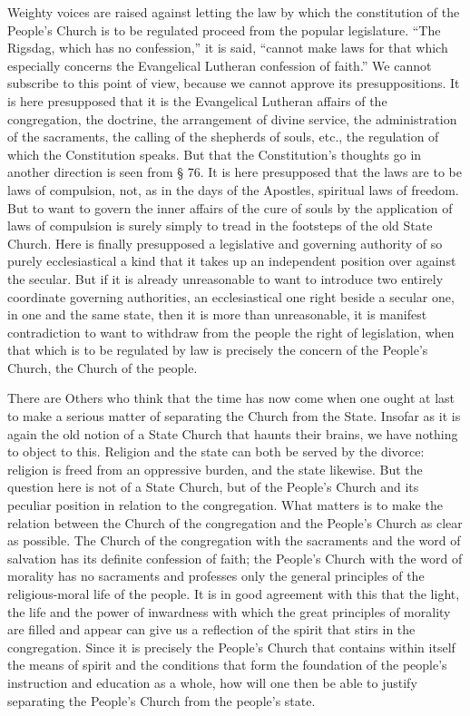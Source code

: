 \documentclass[12pt,a4paper,openany]{book}
\newcommand{\opage}[1]{\marginnote{\footnotesize\textit{[#1]}}}
\newcounter{lect}
\begin{document}
Weighty voices are raised against letting the law
by which the constitution of the People's Church is to be regulated proceed
\setcounter{footnote}{0}%
\opage{108}from the popular legislature. ``The Rigsdag, which has no confession,''
it is said, ``cannot make laws for that which especially
concerns the Evangelical Lutheran confession of faith.''
We cannot subscribe to this point of view, because we
cannot approve its presuppositions. It is here presupposed
that it is the Evangelical Lutheran affairs of the congregation,
the doctrine, the arrangement of divine service, the administration
of the sacraments, the calling of the shepherds of souls, etc.,
the regulation of which the Constitution speaks. But that the Constitution's
thoughts go in another direction is seen from § 76.
It is here presupposed that the laws are to be laws of compulsion,
not, as in the days of the Apostles, spiritual laws of freedom.
But to want to govern the inner affairs of the cure of souls by
the application of laws of compulsion is surely simply to tread in the
footsteps of the old State Church. Here is finally presupposed
a legislative and governing authority of so purely
ecclesiastical a kind that it takes up an independent position
over against the secular. But if it is already unreasonable
to want to introduce two entirely coordinate governing authorities,
an ecclesiastical one right beside a secular one, in
one and the same state, then it is more than unreasonable, it
is manifest contradiction to want to withdraw from the people the right of legislation,
when that which is to be regulated by law is precisely
the concern of the People's Church, the Church of the people.

There are Others who think that the time has now come
when one ought at last to make a serious matter of separating the Church
from the State. Insofar as it is again the old notion
of a State Church that haunts their brains, we
have nothing to object to this. Religion and the state can
both be served by the divorce: religion is freed
from an oppressive burden, and the state likewise. But
the question here is not of a State Church, but of the
\setcounter{footnote}{0}%
\opage{109}People's Church and its peculiar position in relation to the congregation.
What matters is to make the relation between the Church of the congregation
and the People's Church as clear as possible. The Church of the congregation
with the sacraments and the word of salvation has
its definite confession of faith; the People's Church with the word of morality
has no sacraments and professes only
the general principles of the religious-moral life of the people.
It is in good agreement with this
that the light, the life and the power of inwardness with which
the great principles of morality are filled and appear
can give us a reflection of the spirit that stirs
in the congregation. Since it is precisely the People's Church
that contains within itself the means of spirit and the conditions
that form the foundation of the people's instruction
and education as a whole, how will one then be able
to justify separating the People's Church from the people's state.
\end{document}
